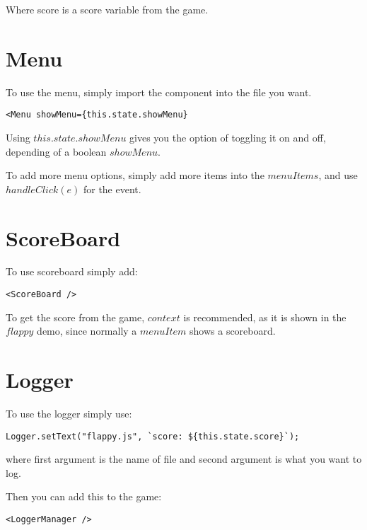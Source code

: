 Where score is a score variable from the game.

\section{Menu}
To use the menu, simply import the component into the file you want.

\begin{lstlisting}
<Menu showMenu={this.state.showMenu}
\end{lstlisting}

Using ${this.state.showMenu}$ gives you the option of toggling it on and off, depending of a boolean $showMenu$.

To add more menu options, simply add more items into the $menuItems$, and use $handleClick(e)$ for the event.

\section{ScoreBoard}
To use scoreboard simply add:

\begin{lstlisting}
<ScoreBoard />
\end{lstlisting}

To get the score from the game, $context$ is recommended, as it is shown in the $flappy$ demo, since normally a $menuItem$ shows a scoreboard.

\section{Logger}
To use the logger simply use:

\begin{lstlisting}
Logger.setText("flappy.js", `score: ${this.state.score}`);
\end{lstlisting}

where first argument is the name of file and second argument is what you want to log.

Then you can add this to the game:
\begin{lstlisting}
<LoggerManager /> 
\end{lstlisting}

  
